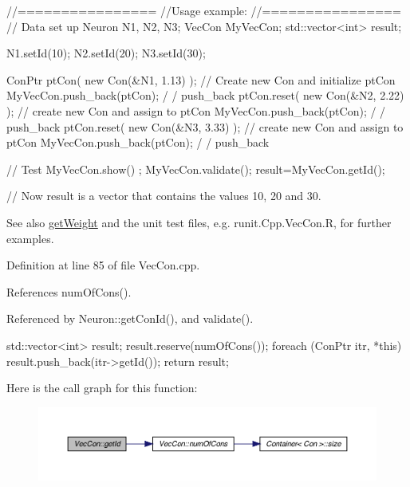 \begin{DoxyCode}
  //================
  //Usage example:
  //================
        // Data set up
                        Neuron N1, N2, N3;
                        VecCon MyVecCon;
                        std::vector<int> result;

                        N1.setId(10);
                        N2.setId(20);
                        N3.setId(30);

                        ConPtr ptCon( new Con(&N1, 1.13) );     // Create new Con
       and initialize ptCon
                        MyVecCon.push_back(ptCon);                              /
      / push_back
                        ptCon.reset(  new Con(&N2, 2.22) );             // create
       new Con and assign to ptCon
                        MyVecCon.push_back(ptCon);                              /
      / push_back
                        ptCon.reset(  new Con(&N3, 3.33) );             // create
       new Con and assign to ptCon
                        MyVecCon.push_back(ptCon);                              /
      / push_back

        // Test
                        MyVecCon.show() ;
                        MyVecCon.validate();
                        result=MyVecCon.getId();

        // Now result is a vector that contains the values 10, 20 and 30.
\end{DoxyCode}


\begin{DoxySeeAlso}{See also}
\hyperlink{class_vec_con_aafa37c30d566b8784ac84d23a14b5638}{getWeight} and the unit test files, e.g. runit.Cpp.VecCon.R, for further examples. 
\end{DoxySeeAlso}


Definition at line 85 of file VecCon.cpp.



References numOfCons().



Referenced by Neuron::getConId(), and validate().


\begin{DoxyCode}
                              {
        std::vector<int> result;
        result.reserve(numOfCons());
        foreach (ConPtr itr, *this){
                result.push_back(itr->getId());
        }
        return result;
}
\end{DoxyCode}


Here is the call graph for this function:\nopagebreak
\begin{figure}[H]
\begin{center}
\leavevmode
\includegraphics[width=400pt]{class_vec_con_a03d5dde143e166e68b01c9596573eb5f_cgraph}
\end{center}
\end{figure}




